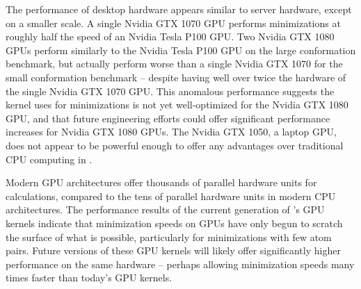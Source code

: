The performance of desktop hardware appears similar to server hardware, except on a smaller scale. A single Nvidia GTX 1070 GPU performs minimizations at roughly half the speed of an Nvidia Tesla P100 GPU. Two Nvidia GTX 1080 GPUs perform similarly to the Nvidia Tesla P100 GPU on the large conformation benchmark, but actually perform worse than a single Nvidia GTX 1070 for the small conformation benchmark -- despite having well over twice the hardware of the single Nvidia GTX 1070 GPU. This anomalous performance suggests the kernel  uses for minimizations is not yet well-optimized for the Nvidia GTX 1080 GPU, and that future engineering efforts could offer significant performance increases for Nvidia GTX 1080 GPUs. The Nvidia GTX 1050, a laptop GPU, does not appear to be powerful enough to offer any advantages over traditional CPU computing in .

Modern GPU architectures offer thousands of parallel hardware units for calculations, compared to the tens of parallel hardware units in modern CPU architectures. The performance results of the current generation of \osprey's GPU kernels indicate that minimization speeds on GPUs have only begun to scratch the surface of what is possible, particularly for minimizations with few atom pairs. Future versions of these GPU kernels will likely offer significantly higher performance on the same hardware -- perhaps allowing minimization speeds many times faster than today's GPU kernels.

